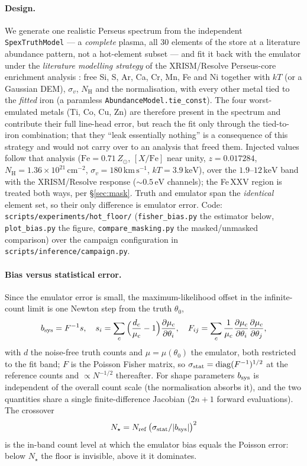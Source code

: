 \documentclass[11pt,a4paper]{article}
\newcommand{\nh}{N_{\mathrm{H}}}
\newcommand{\kev}{\,\mathrm{keV}}
\newcommand{\kms}{\,\mathrm{km\,s^{-1}}}
\newcommand{\zsun}{Z_\odot}
\newcommand{\code}[1]{\texttt{#1}}
\begin{document}
\paragraph{Design.} We generate one realistic Perseus spectrum from the
independent \code{SpexTruthModel} --- a \emph{complete} plasma, all 30 elements
of the store at a literature abundance pattern, not a hot-element subset --- and
fit it back with the emulator under the \emph{literature modelling strategy} of
the XRISM/Resolve Perseus-core enrichment analysis \citep{xrism_perseus}: free
Si, S, Ar, Ca, Cr, Mn, Fe and Ni together with $kT$ (or a Gaussian DEM),
$\sigma_v$, $\nh$ and the normalisation, with every other metal tied to the
\emph{fitted} iron (a paramless \code{AbundanceModel.tie\_const}). The four
worst-emulated metals (Ti, Co, Cu, Zn) are therefore present in the spectrum
and contribute their full line-head error, but reach the fit only through the
tied-to-iron combination; that they ``leak essentially nothing'' is a
consequence of this strategy and would not carry over to an analysis that freed
them. Injected values follow that analysis ($\mathrm{Fe}=0.71\,\zsun$,
$[X/\mathrm{Fe}]$ near unity, $z=0.017284$,
$\nh=1.36\times10^{21}\,\mathrm{cm^{-2}}$, $\sigma_v=180\kms$, $kT=3.9\kev$),
over the $1.9$--$12\kev$ band with the XRISM/Resolve response
($\sim0.5\,\mathrm{eV}$ channels); the Fe\,XXV region is treated both ways, per
\S\ref{sec:mask}. Truth and emulator span the \emph{identical} element set, so
their only difference is emulator error. Code:
\code{scripts/experiments/hot\_floor/} (\code{fisher\_bias.py} the estimator
below, \code{plot\_bias.py} the figure, \code{compare\_masking.py} the
masked/unmasked comparison) over the campaign configuration in
\code{scripts/inference/campaign.py}.

\paragraph{Bias versus statistical error.} Since the emulator error is small, the
maximum-likelihood offset in the infinite-count limit is one Newton step from the
truth $\theta_0$,
\begin{equation}
b_{\rm sys}=F^{-1}s,\quad
s_i=\sum_c\Big(\frac{d_c}{\mu_c}-1\Big)\frac{\partial\mu_c}{\partial\theta_i},\quad
F_{ij}=\sum_c\frac{1}{\mu_c}
       \frac{\partial\mu_c}{\partial\theta_i}\frac{\partial\mu_c}{\partial\theta_j},
\end{equation}
with $d$ the noise-free truth counts and $\mu=\mu(\theta_0)$ the emulator, both
restricted to the fit band; $F$ is the Poisson Fisher matrix, so
$\sigma_{\rm stat}=\mathrm{diag}(F^{-1})^{1/2}$ at the reference counts and
$\propto N^{-1/2}$ thereafter. For shape parameters $b_{\rm sys}$ is independent
of the overall count scale (the normalisation absorbs it), and the two quantities
share a single finite-difference Jacobian ($2n{+}1$ forward evaluations). The
crossover
\begin{equation}
N_\star = N_{\rm ref}\,\big(\sigma_{\rm stat}/|b_{\rm sys}|\big)^2
\end{equation}
is the in-band count level at which the emulator bias equals the Poisson error:
below $N_\star$ the floor is invisible, above it it dominates.
\end{document}
